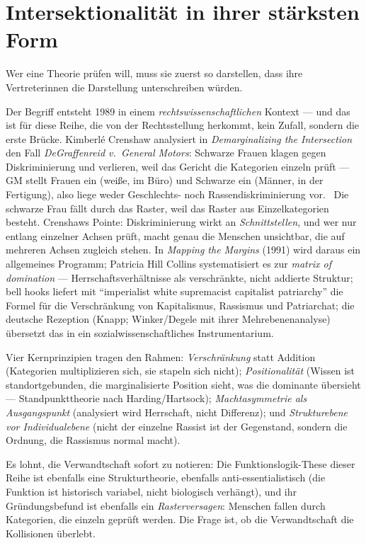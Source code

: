 \section{Intersektionalität in ihrer stärksten Form}

Wer eine Theorie prüfen will, muss sie zuerst so darstellen, dass ihre
Vertreterinnen die Darstellung unterschreiben würden.

Der Begriff entsteht 1989 in einem \emph{rechtswissenschaftlichen} Kontext ---
und das ist für diese Reihe, die von der Rechtsstellung herkommt, kein Zufall,
sondern die erste Brücke. Kimberlé Crenshaw analysiert in
\textit{Demarginalizing the Intersection} den Fall \textit{DeGraffenreid v.\
General Motors}: Schwarze Frauen klagen gegen Diskriminierung und verlieren,
weil das Gericht die Kategorien einzeln prüft --- GM stellt Frauen ein (weiße,
im Büro) und Schwarze ein (Männer, in der Fertigung), also liege weder
Geschlechts- noch Rassendiskriminierung vor. \belegt\ Die schwarze Frau fällt
durch das Raster, weil das Raster aus Einzelkategorien besteht. Crenshaws
Pointe: Diskriminierung wirkt an \emph{Schnittstellen}, und wer nur entlang
einzelner Achsen prüft, macht genau die Menschen unsichtbar, die auf mehreren
Achsen zugleich stehen. In \textit{Mapping the Margins} (1991) wird daraus ein
allgemeines Programm; Patricia Hill Collins systematisiert es zur
\textit{matrix of domination} --- Herrschaftsverhältnisse als verschränkte,
nicht addierte Struktur; bell hooks liefert mit \enquote{imperialist white
supremacist capitalist patriarchy} die Formel für die Verschränkung von
Kapitalismus, Rassismus und Patriarchat; die deutsche Rezeption (Knapp;
Winker/Degele mit ihrer Mehrebenenanalyse) übersetzt das in ein
sozialwissenschaftliches Instrumentarium. \belegt

Vier Kernprinzipien tragen den Rahmen: \emph{Verschränkung} statt Addition
(Kategorien multiplizieren sich, sie stapeln sich nicht); \emph{Positionalität}
(Wissen ist standortgebunden, die marginalisierte Position sieht, was die
dominante übersieht --- Standpunkttheorie nach Harding/Hartsock);
\emph{Machtasymmetrie als Ausgangspunkt} (analysiert wird Herrschaft, nicht
Differenz); und \emph{Strukturebene vor Individualebene} (nicht der einzelne
Rassist ist der Gegenstand, sondern die Ordnung, die Rassismus normal macht).

Es lohnt, die Verwandtschaft sofort zu notieren: Die Funktionslogik-These
dieser Reihe ist ebenfalls eine Strukturtheorie, ebenfalls anti-essentialistisch
(die Funktion ist historisch variabel, nicht biologisch verhängt), und ihr
Gründungsbefund ist ebenfalls ein \emph{Rasterversagen}: Menschen fallen durch
Kategorien, die einzeln geprüft werden. Die Frage ist, ob die Verwandtschaft
die Kollisionen überlebt.

